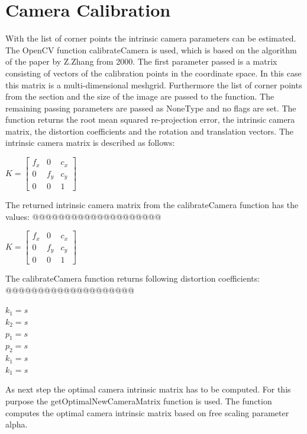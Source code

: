 \documentclass[twocolumn,10pt]{asme2ej}
\begin{document}
\section{Camera Calibration}
\label{section:calibration}
\noindent

With the list of corner points the intrinsic camera parameters can be estimated. 
The OpenCV function calibrateCamera\cite{opencv_calibrateCamera} is used, which is based on the algorithm of the paper by Z.Zhang\cite{zhang2000flexible} from 2000. 
The first parameter passed is a matrix consisting of vectors of the calibration points in the coordinate space. In this case this matrix is a multi-dimensional meshgrid. Furthermore the list of corner points from the  section and the size of the image are passed to the function. The remaining passing parameters are passed as NoneType and no flags are set. The function returns the root mean squared re-projection error, the intrinsic camera matrix, the distortion coefficients and the rotation and translation vectors.
The intrinsic camera matrix is described as follows: 
\begin{center}
    $K = \begin{bmatrix}
   f_x & 0 & c_x \\
   0 & f_y & c_y \\
   0 & 0 & 1
   \end{bmatrix}
   $
    \label{eq_intrinsicmatrix}
\end{center}
The returned intrinsic camera matrix from the calibrateCamera function has the values:
@@@@@@@@@@@@@@@@@@@@
\begin{center}
    $K = \begin{bmatrix}
   f_x & 0 & c_x \\
   0 & f_y & c_y \\
   0 & 0 & 1
\end{bmatrix}
   $
    \label{eq_calculatedintrinsicmatrix}
\end{center}
The calibrateCamera function returns following distortion coefficients:
@@@@@@@@@@@@@@@@@@@@
\begin{center}
    $k_1 = s$\\
    $k_2 = s$\\
    $p_1 = s$\\
    $p_2 = s$\\
    $k_1 = s$\\
    $k_1 = s$
    \label{eq_distcoeff}
\end{center}
As next step the optimal camera intrinsic matrix has to be computed. For this purpose the getOptimalNewCameraMatrix function\cite{opencv_getOptimalNewCameraMatrix} is used. The function computes the optimal camera intrinsic matrix based on free scaling parameter alpha.
\end{document}
